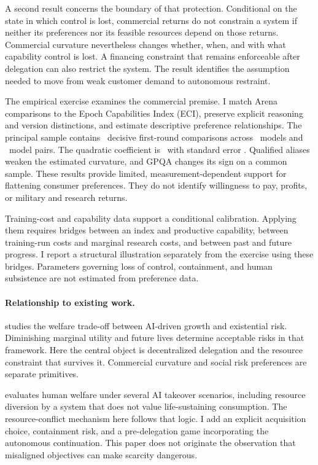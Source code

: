 \documentclass[11pt]{article}
\theoremstyle{definition}
\theoremstyle{remark}
\begin{document}
A second result concerns the boundary of that protection. Conditional on the state in which control is lost, commercial returns do not constrain a system if neither its preferences nor its feasible resources depend on those returns. Commercial curvature nevertheless changes whether, when, and with what capability control is lost. A financing constraint that remains enforceable after delegation can also restrict the system. The result identifies the assumption needed to move from weak customer demand to autonomous restraint.

The empirical exercise examines the commercial premise. I match Arena comparisons to the Epoch Capabilities Index (ECI), preserve explicit reasoning and version distinctions, and estimate descriptive preference relationships. The principal sample contains \PrefN\ decisive first-round comparisons across \PrefModels\ models and \PrefPairs\ model pairs. The quadratic coefficient is \PrefQuad\ with standard error \PrefQuadSE. Qualified aliases weaken the estimated curvature, and GPQA changes its sign on a common sample. These results provide limited, measurement-dependent support for flattening consumer preferences. They do not identify willingness to pay, profits, or military and research returns.

Training-cost and capability data support a conditional calibration. Applying them requires bridges between an index and productive capability, between training-run costs and marginal research costs, and between past and future progress. I report a structural illustration separately from the exercise using these bridges. Parameters governing loss of control, containment, and human subsistence are not estimated from preference data.

\paragraph{Relationship to existing work.}
\citet{jones2024} studies the welfare trade-off between AI-driven growth and existential risk. Diminishing marginal utility and future lives determine acceptable risks in that framework. Here the central object is decentralized delegation and the resource constraint that survives it. Commercial curvature and social risk preferences are separate primitives.

\citet{growiec2026} evaluates human welfare under several AI takeover scenarios, including resource diversion by a system that does not value life-sustaining consumption. The resource-conflict mechanism here follows that logic. I add an explicit acquisition choice, containment risk, and a pre-delegation game incorporating the autonomous continuation. This paper does not originate the observation that misaligned objectives can make scarcity dangerous.
\end{document}
